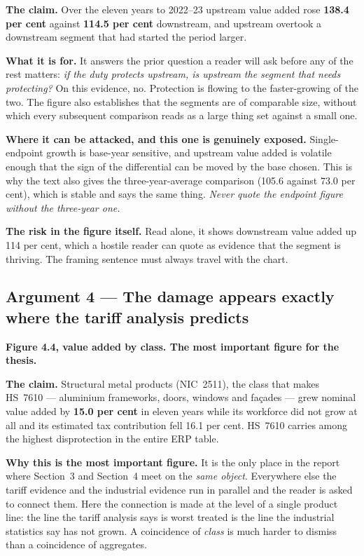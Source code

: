 \documentclass[11pt, a4paper]{article}
\begin{document}
\textbf{The claim.} Over the eleven years to 2022--23 upstream value added rose
\textbf{138.4 per cent} against \textbf{114.5 per cent} downstream, and upstream
overtook a downstream segment that had started the period larger.

\textbf{What it is for.} It answers the prior question a reader will ask before any of
the rest matters: \emph{if the duty protects upstream, is upstream the segment that
needs protecting?} On this evidence, no. Protection is flowing to the faster-growing
of the two. The figure also establishes that the segments are of comparable size,
without which every subsequent comparison reads as a large thing set against a small
one.

\textbf{Where it can be attacked, and this one is genuinely exposed.} Single-endpoint
growth is base-year sensitive, and upstream value added is volatile enough that the
sign of the differential can be moved by the base chosen. This is why the text also
gives the three-year-average comparison (105.6 against 73.0 per cent), which is stable
and says the same thing. \emph{Never quote the endpoint figure without the three-year
one.}

\textbf{The risk in the figure itself.} Read alone, it shows downstream value added up
114 per cent, which a hostile reader can quote as evidence that the segment is
thriving. The framing sentence must always travel with the chart.

\subsection{Argument 4 --- The damage appears exactly where the tariff analysis predicts}
\textbf{Figure 4.4, value added by class. The most important figure for the thesis.}

\textbf{The claim.} Structural metal products (NIC~2511), the class that makes
HS~7610 --- aluminium frameworks, doors, windows and fa\c{c}ades --- grew nominal value
added by \textbf{15.0 per cent} in eleven years while its workforce did not grow at
all and its estimated tax contribution fell 16.1 per cent. HS~7610 carries among the
highest disprotection in the entire ERP table.

\textbf{Why this is the most important figure.} It is the only place in the report
where Section~3 and Section~4 meet on the \emph{same object}. Everywhere else the
tariff evidence and the industrial evidence run in parallel and the reader is asked to
connect them. Here the connection is made at the level of a single product line: the
line the tariff analysis says is worst treated is the line the industrial statistics
say has not grown. A coincidence of \emph{class} is much harder to dismiss than a
coincidence of aggregates.
\end{document}
